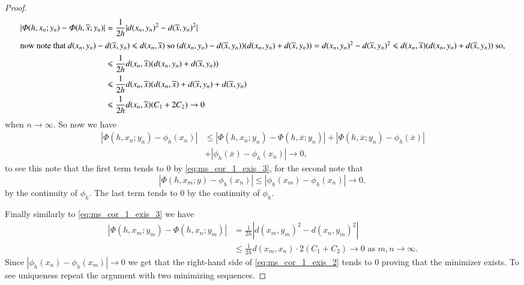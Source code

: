 \documentclass[a4paper,11pt, leqno]{scrreprt} %
\renewcommand{\leq}{\leqslant}
\renewcommand{\leq}{\leqslant}
\theoremstyle{change}
\theoremstyle{nonumberplain}
\newtheorem{proof}{Proof}
\begin{document}
\begin{proof}
\begin{equation}
\begin{split}
      |\Phi(h, x_n; y_n) - \Phi(h, \overline x; y_n)| &= \frac1{2h}
      |d(x_n, y_n)^2 - d(\overline x, y_n)^2|\\
     \shortintertext{now note that $d(x_n, y_n) - d(\overline x, y_n)
       \leq d(x_n, \overline x)$ so $(d(x_n, y_n) - d(\overline x,
       y_n))(d(x_n, y_n) + d(\overline x, y_n)) = d(x_n, y_n)^2 -
       d(\overline x, y_n)^2 \leq d(x_n, \overline x)(d(x_n, y_n) +
       d(\overline x, y_n))$ so,}
      &\leq\frac1{2h} d(x_n, \overline x)(d(x_n, y_n) +
       d(\overline x, y_n))\\
       &\leq \frac1{2h} d(x_n, \overline x)(d(x_n, \overline x) +
       d(\overline x, y_n) + d(\overline x, y_n)\\
       &\leq \frac1{2h} d(x_n, \overline x)(C_1 + 2C_2) \to 0
    \end{split}
  \end{equation}
  when $n \to \infty$. So now we have
  \begin{equation}
    \label{eq:ms_cor_1_exis_4}
    \begin{split}
      |\Phi(h, x_n; y_n) - \phi_h(x_n)| &\leq |\Phi(h, x_n; y_n) -
      \Phi(h, \overline x; y_n)| + |\Phi(h, \overline x; y_n) -
      \phi_h(\overline x)|\\
      &+ |\phi_h(\overline x) - \phi_h(x_n)| \to 0,
    \end{split}
  \end{equation}
  to see this note that the first term tends to $0$ by
  \eqref{eq:ms_cor_1_exis_3}, for the second note that
  \begin{equation}
    \label{eq:ms_cor_1_exis_5}
    |\Phi(h, x_m; y) - \phi_h(x_n)| \leq |\phi_h(x_m) - \phi_h(x_n)|
    \to 0,
  \end{equation}
  by the continuity of $\phi_h$. The last term tends to $0$ by the
  continuity of $\phi_h$.

  Finally similarly to \eqref{eq:ms_cor_1_exis_3} we have
  \begin{equation}
    \label{eq:ms_cor_1_exis_6}
    \begin{split}
      |\Phi(h, x_m; y_m) - \Phi(h, x_n; y_m)| &= \frac1{2h} |d(x_m,
      y_m)^2 - d(x_n, y_m)^2|\\
      &\leq \frac1{2h} d(x_m, x_n) \cdot 2(C_1 + C_2) \to 0 \text{ as
        $m, n \to \infty$}.
    \end{split}
  \end{equation}
  Since $|\phi_h(x_n) - \phi_h(x_m)| \to 0$ we get that the right-hand
  side of \eqref{eq:ms_cor_1_exis_2} tends to $0$ proving that the
  minimizer exists. To see uniqueness repeat the argument with two
  minimizing sequences.
\end{proof}
\end{document}
